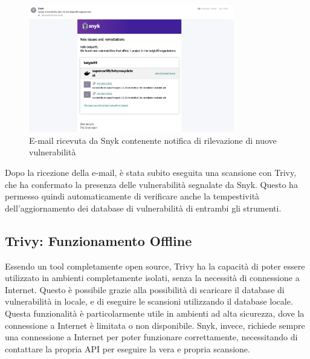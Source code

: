 \begin{figure}[H]
   \centering
   \includegraphics[width=0.8\textwidth]{immagini/capitolo2/snyk_email.png}
   \caption{E-mail ricevuta da Snyk contenente notifica di rilevazione di nuove vulnerabilità}
   \label{fig:snyk_email}
\end{figure}

Dopo la ricezione della e-mail, è stata subito eseguita una scansione con Trivy, che ha confermato la presenza delle vulnerabilità segnalate da Snyk. Questo ha permesso quindi automaticamente di verificare anche la tempestività dell'aggiornamento dei database di vulnerabilità di entrambi gli strumenti.

\subsection{Trivy: Funzionamento Offline}
Essendo un tool completamente open source, Trivy ha la capacità di poter essere utilizzato in ambienti completamente isolati, senza la necessità di connessione a Internet. Questo è possibile grazie alla possibilità di scaricare il database di vulnerabilità in locale, e di eseguire le scansioni utilizzando il database locale. Questa funzionalità è particolarmente utile in ambienti ad alta sicurezza, dove la connessione a Internet è limitata o non disponibile. Snyk, invece, richiede sempre una connessione a Internet per poter funzionare correttamente, necessitando di contattare la propria API per eseguire la vera e propria scansione.

